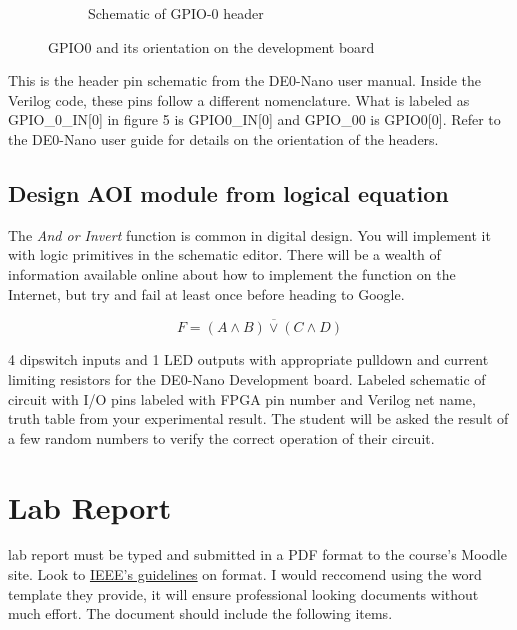 \begin{figure}
\begin{subfigure}[b]{.45\textwidth}
            \caption{Schematic of GPIO-0 header\cite{DE0Manual}}
          \end{subfigure}
          \caption{GPIO0 and its orientation on the development board}
          \label{pinmap}
        \end{figure}
        This is the header pin schematic from the DE0-Nano user manual. Inside the Verilog code, these pins follow a different nomenclature. What is labeled as GPIO\_0\_IN[0] in figure 5 is GPIO0\_IN[0] and GPIO\_00 is GPIO0[0]. Refer to the DE0-Nano user guide for details on the orientation of the headers.        

      \subsection{Design AOI module from logical equation} 
        The {\it And or Invert} function is common in digital design. You will implement it with logic primitives in the schematic editor. There will be a wealth of information available online about how to implement the function on the Internet, but try and fail at least once before heading to Google.

      \begin{displaymath}
        F = \overline{(A \wedge B) \vee (C \wedge D)}
      \end{displaymath}

                  {4 dipswitch inputs and 1 LED outputs with appropriate pulldown and current limiting resistors for the DE0-Nano Development board. }
                  {Labeled schematic of circuit with I/O pins labeled with FPGA pin number and Verilog net name,  truth table from your  experimental result.}
                  {The student will be asked the result of a few random numbers to verify the correct operation of their circuit.}

  \section{Lab Report}
     lab report must be typed and submitted in a PDF format to the course's Moodle site. Look to \href{http://www.ieee.org/conferences_events/conferences/publishing/templates.html}{IEEE's guidelines} on format. I would reccomend  using the word template they provide, it will ensure professional looking documents without much effort. The document should include the following items.
    
